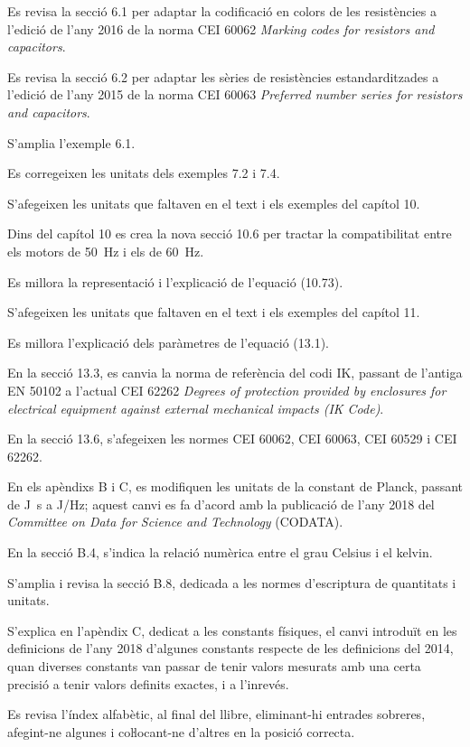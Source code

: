 Es revisa la secció 6.1 per adaptar la codificació en colors de les resistències a l'edició de l'any 2016 de la norma CEI 60062 \textit{Marking codes for resistors and capacitors}.

Es revisa la secció 6.2 per adaptar les sèries de resistències estandarditzades a l'edició de l'any 2015 de la norma CEI 60063 \textit{Preferred number series for resistors and capacitors}.

S'amplia l'exemple 6.1.

Es corregeixen les unitats dels exemples 7.2 i 7.4.

S'afegeixen les unitats que faltaven en el text i els exemples del capítol 10. 

Dins del capítol 10 es crea la nova secció 10.6 per tractar la compatibilitat entre els motors de \qty{50}{Hz} i els de \qty{60}{Hz}.

Es millora la representació i l'explicació de l'equació (10.73).

S'afegeixen les unitats que faltaven en el text i els exemples del capítol 11.

Es millora l'explicació dels paràmetres de l'equació  (13.1).

En la  secció 13.3, es canvia la norma de referència del codi IK, passant de l'antiga EN 50102 a l'actual CEI 62262 \textit{Degrees of protection provided by enclosures for
electrical equipment against external mechanical impacts (IK Code)}.

En la secció 13.6, s'afegeixen les normes CEI 60062,  CEI 60063,  CEI 60529 i  CEI 62262.

En els apèndixs  B i C, es modifiquen les unitats de la constant de Planck, passant de \unit{J.s} a \unit{J/Hz}; aquest canvi es fa d'acord amb  la publicació de l'any 2018 del \textit{Committee on Data for Science and Technology} (CODATA).

En la secció B.4, s'indica la relació numèrica entre el grau Celsius i el kelvin.

S'amplia i revisa la secció B.8, dedicada a les normes d'escriptura de quantitats i unitats.


S'explica en l'apèndix C, dedicat a les constants físiques,  el canvi introduït en les definicions de l'any 2018 d'algunes constants respecte de les definicions del 2014, quan diverses constants  van passar de tenir valors mesurats amb una certa precisió a tenir valors definits exactes, i a l'inrevés.

Es revisa l'índex alfabètic, al final del llibre, eliminant-hi entrades sobreres, afegint-ne algunes i coŀlocant-ne d'altres en la posició correcta.


